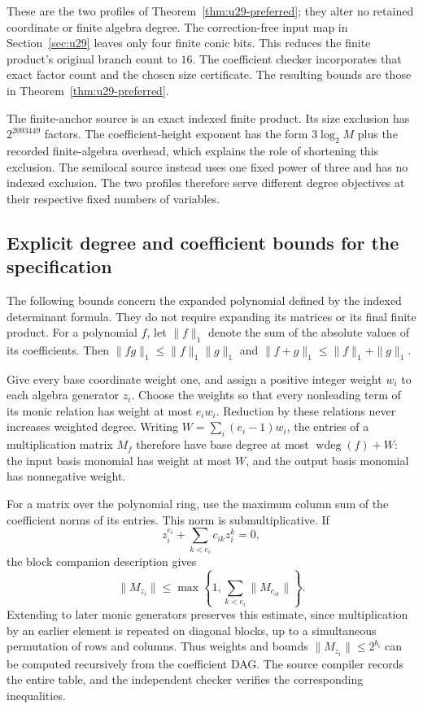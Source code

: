 \documentclass[11pt,a4paper]{article}
\theoremstyle{definition}
\theoremstyle{remark}
\begin{document}
These are the two profiles of Theorem~\ref{thm:u29-preferred}; they
alter no retained coordinate or finite algebra degree.  The
correction-free input map in Section~\ref{sec:u29} leaves only four
finite conic bits.  This reduces the finite product's original branch
count to $16$.  The coefficient checker incorporates that exact factor
count and the chosen size certificate.  The resulting bounds are
those in Theorem~\ref{thm:u29-preferred}.

The finite-anchor source is an exact indexed finite product.  Its
size exclusion has $2^{2093449}$ factors.  The coefficient-height
exponent has the form $3\log_2 M$ plus the recorded finite-algebra
overhead, which explains the role of shortening this exclusion.
The semilocal source instead uses one fixed power of three and has no
indexed exclusion.  The two profiles therefore serve different degree
objectives at their respective fixed numbers of variables.
\subsection{Explicit degree and coefficient bounds for the specification}
\label{subsec:finite-algebra-bounds}

The following bounds concern the expanded polynomial defined by the
indexed determinant formula. They do not require expanding its matrices
or its final finite product. For a polynomial $f$, let $\|f\|_1$ denote
the sum of the absolute values of its coefficients. Then
$\|fg\|_1\le\|f\|_1\|g\|_1$ and
$\|f+g\|_1\le\|f\|_1+\|g\|_1$.

Give every base coordinate weight one, and assign a positive integer
weight $w_i$ to each algebra generator $z_i$. Choose the weights so that
every nonleading term of its monic relation has weight at most
$e_iw_i$. Reduction by these relations never increases weighted degree.
Writing $W=\sum_i(e_i-1)w_i$, the entries of a multiplication matrix
$M_f$ therefore have base degree at most $\operatorname{wdeg}(f)+W$:
the input basis monomial has weight at most $W$, and the output basis
monomial has nonnegative weight.

For a matrix over the polynomial ring, use the maximum column sum of
the coefficient norms of its entries. This norm is submultiplicative.
If
\[
 z_i^{e_i}+\sum_{k<e_i}c_{ik}z_i^k=0,
\]
the block companion description gives
\[
 \|M_{z_i}\|\le
 \max\left\{1,\sum_{k<e_i}\|M_{c_{ik}}\|\right\}.
\]
Extending to later monic generators preserves this estimate, since
multiplication by an earlier element is repeated on diagonal blocks,
up to a simultaneous permutation of rows and columns. Thus weights
and bounds $\|M_{z_i}\|\le2^{b_i}$ can be computed recursively from
the coefficient DAG. The source compiler records the entire table,
and the independent checker verifies the corresponding inequalities.
\end{document}

